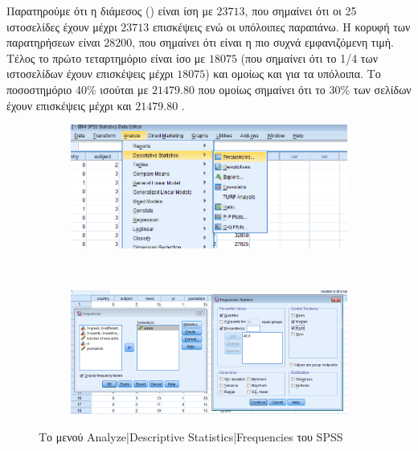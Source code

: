 \documentclass{assignment}
\begin{document}
\begin{Assignment}[Μέρος Α]
Παρατηρούμε ότι η διάμεσος () είναι ίση με $23713$, που σημαίνει ότι οι 25 ιστοσελίδες έχουν μέχρι $23713$ επισκέψεις ενώ οι υπόλοιπες παραπάνω. Η κορυφή των παρατηρήσεων είναι $28200$, που σημαίνει ότι είναι η πιο συχνά εμφανιζόμενη τιμή. Τέλος το πρώτο τεταρτημόριο είναι ίσο με $18075$ (που σημαίνει ότι το 1/4 των ιστοσελίδων έχουν επισκέψεις μέχρι $18075$) και ομοίως και για τα υπόλοιπα. Το ποσοστημόριο 40\% ισούται με $21479.80$ που ομοίως σημαίνει ότι το 30\% των σελίδων έχουν επισκέψεις μέχρι και $21479.80$ .

\begin{figure}[htbp]
  \centering
  \begin{subfigure}[b]{0.5\textwidth}
     \includegraphics[width=\textwidth,height=0.25\textheight]{images/menu_frequencies.png}
  \end{subfigure}%
   ~ %
  \begin{subfigure}[b]{0.5\textwidth}
    \includegraphics[width=\textwidth,height=0.25\textheight]{images/frequencies.png}
  \end{subfigure}
  \caption{Το μενού Analyze|Descriptive Statistics|Frequencies του SPSS}
\label{fig:frequencies}
\end{figure}

\AssignmentTitle{%

}
\end{Assignment}
\end{document}
